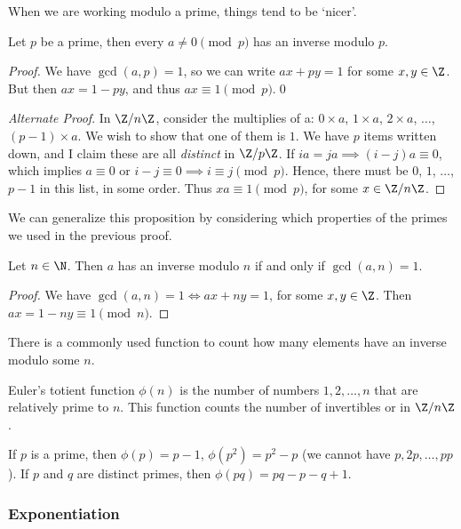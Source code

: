 When we are working modulo a prime, things tend to be `nicer'.

\begin{proposition}
	Let $p$ be a prime, then every $a \neq 0 \pmod{p}$ has an inverse modulo $p$.
\end{proposition}
\begin{proof}
	We have $\gcd(a, p) = 1$, so we can write $ax + py = 1$ for some $x,y \in \Z$. But then $ax = 1 - py$, and thus $ax \equiv 1 \pmod{p}$.\hfill\qed

	\emph{Alternate Proof}. 
	In $\Z/n\Z$, consider the multiplies of a: $0\times a$, $1 \times a$, $2 
	\times a$, $\dots$, $(p - 1)\times a$. We wish to show that one of them is $1$. We have $p$ items written down, and I claim these are all \emph{distinct} in $\Z/p\Z$. If $ia = ja \implies (i - j)a \equiv 0$, which implies $a \equiv 0$ or $i -j \equiv 0 \implies i \equiv j \pmod{p}$. Hence, there must be $0$, $1$, $\dots$, $p - 1$ in this list, in some order. Thus $xa \equiv 1 \pmod{p}$, for some $x \in \Z/n\Z$.
\end{proof}

We can generalize this proposition by considering which properties of the primes we used in the previous proof.

\begin{proposition}
	Let $n \in \N$. Then $a$ has an inverse modulo $n$ if and only if $\gcd(a, n) = 1$.
\end{proposition}
\begin{proof}
	We have $\gcd(a, n) = 1 \iff ax + ny = 1$, for some $x, y \in \Z$. Then $ax = 1 - ny \equiv 1 \pmod{n}$.
\end{proof}

There is a commonly used function to count how many elements have an inverse modulo some $n$.

\begin{definition}
	Euler's totient function $\phi(n)$ is the number of numbers $1, 2, \dots, n$ that are relatively prime to $n$.
	This function counts the number of invertibles or  in $\Z/n\Z$.
\end{definition}

\begin{example}
	If $p$ is a prime, then $\phi(p) = p - 1$, $\phi(p^2) = p^2 - p$ (we cannot have $p, 2p, \dots, pp$). If $p$ and $q$ are distinct primes, then $\phi(pq) = pq - p - q + 1$.
\end{example}

\subsubsection{Exponentiation}

